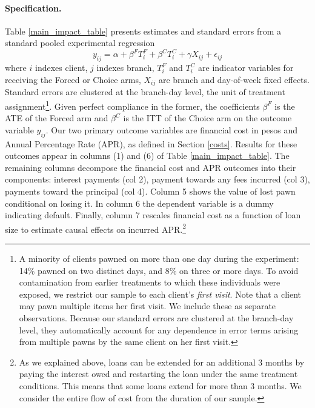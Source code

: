 \documentclass[oneside,11pt]{article}
\begin{document}
\paragraph{Specification.} Table \ref{main_impact_table} presents estimates and standard errors from a standard pooled experimental regression 
\begin{equation} \label{basic_reg}
    y_{ij} = \alpha + \beta^F T_{i}^F + \beta^C T_{i}^C + \gamma X_{ij} + \epsilon_{ij}
\end{equation}
where $i$ indexes client, $j$ indexes branch, $T_{i}^F$ and $T_{i}^C$ are indicator variables for receiving the Forced or Choice arms, $X_{ij}$ are branch and day-of-week fixed effects. Standard errors are clustered at the branch-day level, the unit of treatment assignment\footnote{A minority of clients pawned on more than one day during the experiment: 14\% pawned on two distinct days, and 8\% on three or more days. To avoid contamination from earlier treatments to which these individuals were exposed, we restrict our sample to each client's \emph{first visit}. Note that a client may pawn multiple items her first visit. We include these as separate observations. Because our standard errors are clustered at the branch-day level, they automatically account for any dependence in error terms arising from multiple pawns by the same client on her first visit.}.
Given perfect compliance in the former, the coefficients $\beta^F$ is the ATE of the Forced arm and $\beta^C$ is the ITT of the Choice arm on the outcome variable $y_{ij}$.
Our two primary outcome variables are financial cost in pesos and Annual Percentage Rate (APR), as defined in Section \ref{costs}. 
Results for these outcomes appear in columns (1) and (6) of Table \ref{main_impact_table}.
The remaining columns decompose the financial cost and APR outcomes into their components: interest payments (col 2), payment towards any fees incurred (col 3), payments toward the principal (col 4). Column 5 shows the value of lost pawn conditional on losing it.  In column 6 the dependent variable is a dummy indicating default.  Finally, column 7 rescales financial cost as a function of loan size to estimate causal effects on incurred APR.\footnote{As we explained above, loans can be extended for an additional 3 months by paying the interest owed and restarting the loan under the same treatment conditions. This means that some loans extend for more than 3 months. We consider the entire flow of cost from the duration of our sample.}  
\end{document}

